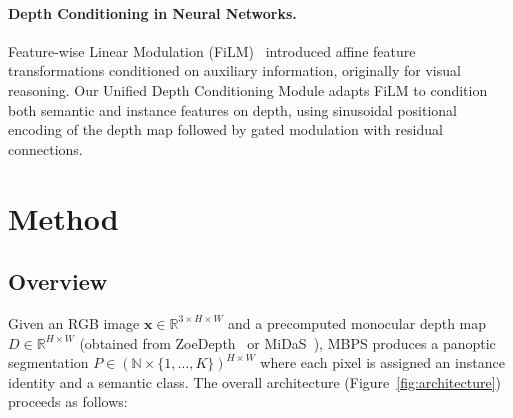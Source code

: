 \documentclass{article}
\begin{document}
\paragraph{Depth Conditioning in Neural Networks.}
Feature-wise Linear Modulation (FiLM)~\cite{perez2018film} introduced affine feature transformations conditioned on auxiliary information, originally for visual reasoning. Our Unified Depth Conditioning Module adapts FiLM to condition both semantic and instance features on depth, using sinusoidal positional encoding of the depth map followed by gated modulation with residual connections.


\section{Method}
\label{sec:method}

\subsection{Overview}
\label{sec:overview}

Given an RGB image $\mathbf{x} \in \mathbb{R}^{3 \times H \times W}$ and a precomputed monocular depth map $D \in \mathbb{R}^{H \times W}$ (obtained from ZoeDepth~\cite{bhat2023zoedepth} or MiDaS~\cite{ranftl2020midas}), MBPS produces a panoptic segmentation $P \in (\mathbb{N} \times \{1, \ldots, K\})^{H \times W}$ where each pixel is assigned an instance identity and a semantic class. The overall architecture (Figure~\ref{fig:architecture}) proceeds as follows:
\end{document}
